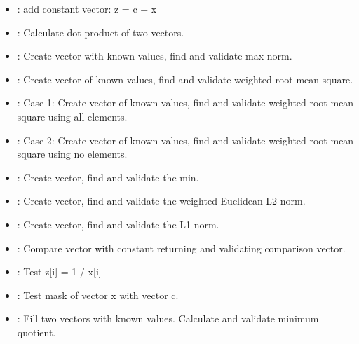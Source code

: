 \documentclass[letterpaper,10pt,english]{sphinxmanual}
\begin{document}
\begin{itemize}
\item {} 
: add constant vector: z = c + x

\item {} 
: Calculate dot product of two vectors.

\item {} 
: Create vector with known values, find and validate max norm.

\item {} 
: Create vector of known values, find and validate weighted root mean square.

\item {} 
: Case 1: Create vector of known values, find and validate weighted root mean square using all elements.

\item {} 
: Case 2: Create vector of known values, find and validate weighted root mean square using no elements.

\item {} 
: Create vector, find and validate the min.

\item {} 
: Create vector, find and validate the weighted Euclidean L2 norm.

\item {} 
: Create vector, find and validate the L1 norm.

\item {} 
: Compare vector with constant returning and validating comparison vector.

\item {} 
: Test z{[}i{]} = 1 / x{[}i{]}

\item {} 
: Test mask of vector x with vector c.

\item {} 
: Fill two vectors with known values. Calculate and validate minimum quotient.

\end{itemize}
\end{document}
